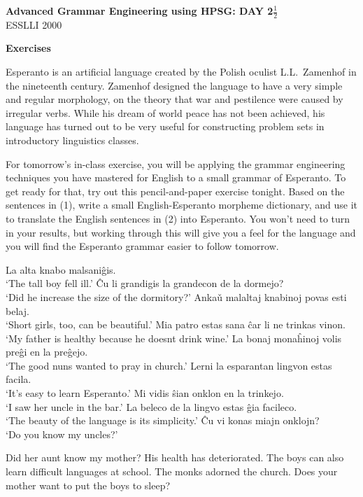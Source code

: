 \documentclass[11pt]{article}
\begin{document}
\begin{center}
\textbf{Advanced Grammar Engineering using HPSG: DAY 2$\frac12$}\\
ESSLLI 2000
\end{center}

\smallskip
\noindent\textbf{Exercises}

Esperanto is an artificial language created by the Polish
oculist L.L.~Zamenhof in the nineteenth century. Zamenhof designed the
language to have a very simple and regular morphology, on the theory that war
and pestilence were caused by irregular verbs. While his dream of world peace
has not been achieved, his language has turned out to be very useful for
constructing problem sets in introductory linguistics classes.

For tomorrow's in-class exercise, you will be applying the grammar engineering
techniques you have mastered for English to a small grammar of Esperanto.  To
get ready for that, try out this pencil-and-paper exercise tonight. Based on the
sentences in (1), write a small English-Esperanto morpheme dictionary, and use
it to translate the English sentences in (2) into Esperanto.  You won't need to
turn in your results, but working through this will give you a feel for the
language and you will find the Esperanto grammar easier to follow tomorrow.
\begin{exe}
\ex
\begin{xlist}
\ex
La alta knabo malsani\^gis.\\
`The tall boy fell ill.'
\ex 
\^Cu li grandigis la grandecon de la dormejo?\\
`Did he increase the size of the dormitory?'
\ex Anka\v{u} malaltaj knabinoj povas esti belaj.\\
`Short girls, too, can be beautiful.'
\ex Mia patro estas sana \^car li ne trinkas vinon.\\
`My father is healthy because he doesnt drink wine.'
\ex
La bonaj mona\^hinoj volis pre\^gi en la pre\^gejo.\\
`The good nuns wanted to pray in church.'
\ex Lerni la esparantan lingvon estas facila.\\
`It's easy to learn Esperanto.'
\ex Mi vidis \^sian onklon en la trinkejo.\\
`I saw her uncle in the bar.'
\ex La beleco de la lingvo estas \^gia facileco.\\
`The beauty of the language is its simplicity.'
\ex \^Cu vi konas miajn onklojn?\\
`Do you know my uncles?'
\end{xlist}
\ex
\begin{xlist}
\ex Did her aunt know my mother?
\ex His health has deteriorated.
\ex The boys can also learn difficult languages at school.
\ex The monks adorned the church.
\ex Does your mother want to put the boys to sleep?
\end{xlist}
\end{exe}
\end{document}
